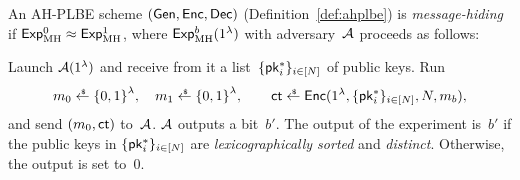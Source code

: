 \begin{definition}\label{def:ahplbe-message-hiding}
An AH-PLBE scheme $({\smash{\mathsf{Gen}}},{\smash{\mathsf{Enc}}},{\smash{\mathsf{Dec}}})$ (Definition~\ref{def:ahplbe})
is \emph{message-hiding} if ${{\smash{\mathsf{Exp}}_{\textup{MH}}^{0}}\approx{\smash{\mathsf{Exp}}_{\textup{MH}}^{1}}}$,
where ${\smash{\mathsf{Exp}}_{\textup{MH}}^{b}}(1^\lambda)$ with adversary~${\mathcal{A}}$ proceeds as follows:
\begin{security}
Launch ${\mathcal{A}}(1^\lambda)$ and
receive from it a list~$\{{\smash{\mathsf{pk}}}_i^\ast\}_{i\in[N]}$ of public keys.
Run
\begin{align*}
m_0\draws\bit^\lambda,\quad
m_1\draws\bit^\lambda,\qquad
\ct\draws\Enc(1^\lambda,\{\pk_i^\ast\}_{i\in[N]},N,m_b),
\end{align*}
and send $(m_0,{\smash{\mathsf{ct}}})$ to~${\mathcal{A}}$.
${\mathcal{A}}$ outputs a bit~$b'$.
The output of the experiment is~$b'$
if the public keys in $\{{\smash{\mathsf{pk}}}_i^\ast\}_{i\in[N]}$ are \emph{lexicographically sorted} and \emph{distinct}.
Otherwise, the output is set to~$0$.
\end{security}
\end{definition}
